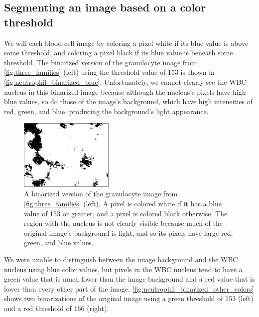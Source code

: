 \FloatBarrier
{}
\subsection{Segmenting an image based on a color threshold}

We will  each blood cell image by coloring a pixel white if its blue value is above some threshold, and coloring a pixel black if its blue value is beneath some threshold. The binarized version of the granulocyte image from \autoref{fig:three_families} (left) using the threshold value of 153 is shown in \autoref{fig:neutrophil_binarized_blue}. Unfortunately, we cannot clearly see the WBC nucleus in this binarized image because although the nucleus's pixels have high blue values, so do those of the image's background, which have high intensities of red, green, and blue, producing the background's light appearance.\\

\begin{figure}[h]
\centering
\mySfFamily
\includegraphics[width = 0.4\textwidth]{../images/neutrophil_binarized_blue.png}
\caption{A binarized version of the granulocyte image from \autoref{fig:three_families} (left). A pixel is colored white if it has a blue value of 153 or greater, and a pixel is colored black otherwise. The region with the nucleus is not clearly visible because much of the original image's background is light, and so its pixels have large red, green, and blue values.}
\label{fig:neutrophil_binarized_blue}
\end{figure}

\begin{qbox}\end{qbox}

We were unable to distinguish between the image background and the WBC nucleus using blue color values, but pixels in the WBC nucleus tend to have a green value that is much lower than the image background and a red value that is lower than every other part of the image. \autoref{fig:neutrophil_binarized_other_colors} shows two binarizations of the original image using a green threshold of 153 (left) and a red threshold of 166 (right).


